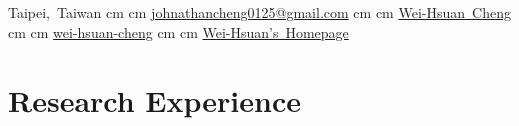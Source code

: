 \documentclass[10pt, letterpaper]{article}
\newenvironment{header}{
    \setlength{\topsep}{0pt}\par\kern\topsep
}{
    \par\kern\topsep
} %
\let\hrefWithoutArrow\href
\renewcommand{\href}[2]{\hrefWithoutArrow{#1}{\ifthenelse{\equal{#2}{}}{ }{#2 }\raisebox{.15ex}{\footnotesize \faExternalLink*}}}
\begin{document}
\begin{minipage}[t]{0.8\textwidth}
\begin{header}
        \mbox{{\color{black}\footnotesize\faMapMarker*}\hspace*{0.13cm}Taipei, Taiwan}%
         cm%
        \AND%
         cm%
        \mbox{\hrefWithoutArrow{mailto:johnathancheng0125@gmail.com}{\color{black}{\footnotesize\faEnvelope[regular]}\hspace*{0.13cm}johnathancheng0125@gmail.com}}%
         cm%
        \AND%
         cm%
        \mbox{\hrefWithoutArrow{https://www.linkedin.com/in/wei-hsuan-cheng-582486264/}{\color{black}{\footnotesize\faLinkedinIn}\hspace*{0.13cm}Wei-Hsuan Cheng}}%
         cm%
        \AND%
         cm%
        \mbox{\hrefWithoutArrow{https://github.com/wei-hsuan-cheng}{\color{black}{\footnotesize\faGithub}\hspace*{0.13cm}wei-hsuan-cheng}}%
         cm%
        \AND%
         cm%
        \mbox{\hrefWithoutArrow{https://wei-hsuan-cheng.github.io}{\color{black}{\footnotesize\faGlobe}\hspace*{0.13cm}Wei-Hsuan's Homepage}}%
        \end{header}
    \end{minipage}

    \vspace{0.1 cm}


    \section{Research Experience}
\end{document}
